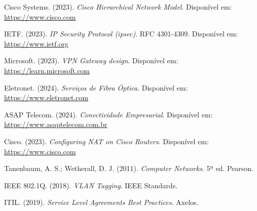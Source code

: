 \documentclass[a4paper, 12pt]{article}
\begin{document}
\begin{thebibliography}{9}

Cisco Systems. (2023). \emph{Cisco Hierarchical Network Model}.
Disponível em: \url{https://www.cisco.com}

IETF. (2023). \emph{IP Security Protocol (ipsec)}. RFC 4301-4309.
Disponível em: \url{https://www.ietf.org}

Microsoft. (2023). \emph{VPN Gateway design}.
Disponível em: \url{https://learn.microsoft.com}

Eletronet. (2024). \emph{Serviços de Fibra Óptica}.
Disponível em: \url{https://www.eletronet.com}

ASAP Telecom. (2024). \emph{Conectividade Empresarial}.
Disponível em: \url{https://www.asaptelecom.com.br}

Cisco. (2023). \emph{Configuring NAT on Cisco Routers}.
Disponível em: \url{https://www.cisco.com}

Tanenbaum, A. S.; Wetherall, D. J. (2011). \emph{Computer Networks}. 5ª ed. Pearson.

IEEE 802.1Q. (2018). \emph{VLAN Tagging}. IEEE Standards.

ITIL. (2019). \emph{Service Level Agreements Best Practices}. Axelos.

\end{thebibliography}
\end{document}
